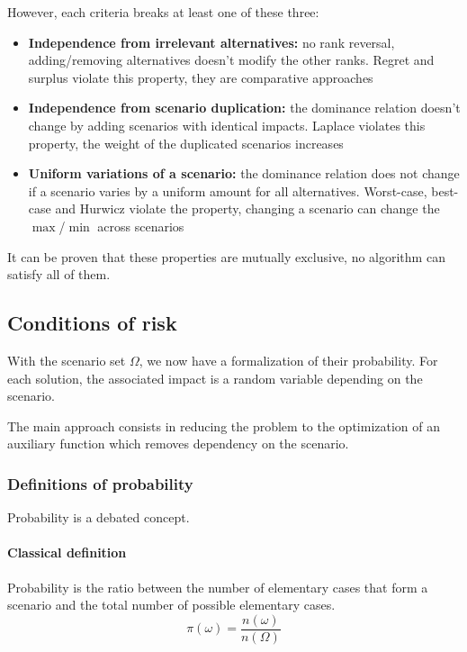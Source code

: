 However, each criteria breaks at least one of these three: 
\begin{itemize}
	\item \textbf{Independence from irrelevant alternatives:} no rank reversal, adding/removing alternatives doesn't modify the other ranks. Regret and surplus violate this property, they are comparative approaches
	
	\item \textbf{Independence from scenario duplication:} the dominance relation doesn't change by adding scenarios with identical impacts. Laplace violates this property, the weight of the duplicated scenarios increases
	
	\item \textbf{Uniform variations of a scenario:} the dominance relation does not change if a scenario varies by a uniform amount for all alternatives. Worst-case, best-case and Hurwicz violate the property, changing a scenario can change the $\max$/$\min$ across scenarios
\end{itemize}

It can be proven that these properties are mutually exclusive, no algorithm can satisfy all of them.

\subsection{Conditions of risk}

With the scenario set $\Omega$, we now have a formalization of their probability. For each solution, the associated impact is a random variable depending on the scenario. 

The main approach consists in reducing the problem to the optimization of an auxiliary function which removes dependency on the scenario. 

\subsubsection{Definitions of probability}

Probability is a debated concept. 

\paragraph{Classical definition} Probability is the ratio between the number of elementary cases that form a scenario and the total number of possible elementary cases. 
$$ \pi (\omega) = \frac{n(\omega)}{n (\Omega)}$$

